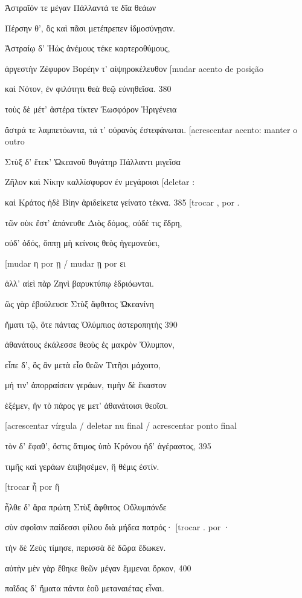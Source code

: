 Ἀστραῖόν τε μέγαν Πάλλαντά τε δῖα θεάων

Πέρσην θ', ὃς καὶ πᾶσι μετέπρεπεν ἰδμοσύνῃσιν.

Ἀστραίῳ δ' Ἠὼς ἀνέμους τέκε καρτεροθύμους,

ἀργεστὴν Ζέφυρον Βορέην τ' αἰψηροκέλευθον {[}mudar acento de posição

καὶ Νότον, ἐν φιλότητι θεὰ θεῷ εὐνηθεῖσα. 380

τοὺς δὲ μέτ' ἀστέρα τίκτεν Ἑωσφόρον Ἠριγένεια

ἄστρά τε λαμπετόωντα, τά τ' οὐρανὸς ἐστεφάνωται. {[}acrescentar acento:
manter o outro

Στὺξ δ' ἔτεκ' Ὠκεανοῦ θυγάτηρ Πάλλαντι μιγεῖσα

Ζῆλον καὶ Νίκην καλλίσφυρον ἐν μεγάροισι {[}deletar :

καὶ Κράτος ἠδὲ Βίην ἀριδείκετα γείνατο τέκνα. 385 {[}trocar , por .

τῶν οὐκ ἔστ' ἀπάνευθε Διὸς δόμος, οὐδέ τις ἕδρη,

οὐδ' ὁδός, ὅππῃ μὴ κείνοις θεὸς ἡγεμονεύει,

{[}mudar η por ῃ / mudar ῃ por ει

ἀλλ' αἰεὶ πὰρ Ζηνὶ βαρυκτύπῳ ἑδριόωνται.

ὣς γὰρ ἐβούλευσε Στὺξ ἄφθιτος Ὠκεανίνη

ἤματι τῷ, ὅτε πάντας Ὀλύμπιος ἀστεροπητὴς 390

ἀθανάτους ἐκάλεσσε θεοὺς ἐς μακρὸν Ὄλυμπον,

εἶπε δ', ὃς ἂν μετὰ εἷο θεῶν Τιτῆσι μάχοιτο,

μή τιν' ἀπορραίσειν γεράων, τιμὴν δὲ ἕκαστον

ἑξέμεν, ἣν τὸ πάρος γε μετ' ἀθανάτοισι θεοῖσι.

{[}acrescentar vírgula / deletar nu final / acrescentar ponto final

τὸν δ' ἔφαθ', ὅστις ἄτιμος ὑπὸ Κρόνου ἠδ' ἀγέραστος, 395

τιμῆς καὶ γεράων ἐπιβησέμεν, ἣ θέμις ἐστίν.

{[}trocar ἧ por ἣ

ἦλθε δ' ἄρα πρώτη Στὺξ ἄφθιτος Οὔλυμπόνδε

σὺν σφοῖσιν παίδεσσι φίλου διὰ μήδεα πατρός· {[}trocar . por ·

τὴν δὲ Ζεὺς τίμησε, περισσὰ δὲ δῶρα ἔδωκεν.

αὐτὴν μὲν γὰρ ἔθηκε θεῶν μέγαν ἔμμεναι ὅρκον, 400

παῖδας δ' ἤματα πάντα ἑοῦ μεταναιέτας εἶναι.

